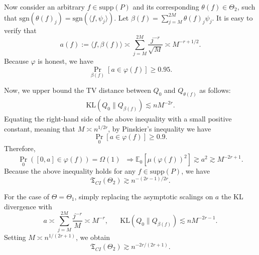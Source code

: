 \documentclass[11pt,a4paper]{article}
\theoremstyle{definition}
\theoremstyle{plain}
\theoremstyle{remark}
\begin{document}
Now consider an arbitrary $f\in\mathrm{supp}(P)$ and its corresponding $\theta(f)\in\Theta_2$, such that $\mathrm{sgn}(\theta(f)_j)=\mathrm{sgn}(\langle f,\psi_j\rangle)$.
Let $\beta(f) =\sum_{j=M}^{2M}\theta(f)_j\psi_j$.
It is easy to verify that
$$
a(f) := \langle f, \beta(f)\rangle \asymp \sum_{j=M}^{2M}\frac{j^{-r}}{\sqrt{M}}\asymp M^{-r+1/2}.
$$
Because $\varphi$ is honest, we have
$$
\Pr_{\beta(f)}[a\in\varphi(f)] \geq 0.95.
$$

Now, we upper bound the TV distance between $Q_0$ and $Q_{\theta(f)}$ as follows:
\begin{align*}
\mathrm{KL}(Q_0\|Q_{\beta(f)}) \lesssim nM^{-2r}.
\end{align*}
Equating the right-hand side of the above inequality with a small positive constant, meaning that $M\asymp n^{1/2r}$, by Pinskier's inequality we have
$$
\Pr_{0}[a\in\varphi(f)] \geq 0.9.
$$
Therefore,
$$
\Pr_{0}\left([0,a]\in\varphi(f)\right) = \Omega(1) \;\;\Longrightarrow \mathbb E_0\left[\mu(\varphi(f))^2\right] \gtrsim a^2 \gtrsim M^{-2r+1}.
$$
Because the above inequality holds for any $f\in\mathrm{supp}(P)$, we have
$$
\mathfrak T_{CI}(\Theta_2) \gtrsim n^{-(2r-1)/2r}. 
$$

For the case of $\Theta=\Theta_1$, simply replacing the asymptotic scalings on $a$ the KL divergence with
$$
a \asymp \sum_{j=M}^{2M}\frac{j^{-r}}{{M}}\asymp M^{-r}, \;\;\;\;\;\;\mathrm{KL}(Q_0\|Q_{\beta(f)}) \lesssim n M^{-2r-1}.
$$
Setting $M\asymp n^{1/(2r+1)}$, we obtain
$$
\mathfrak T_{CI}(\Theta_2) \gtrsim n^{-2r/(2r+1)}.
$$



\end{document}
